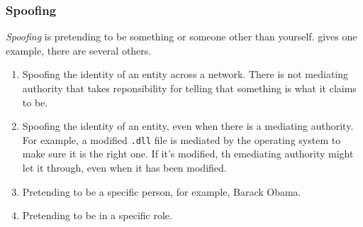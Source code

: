 \subsubsection{Spoofing}\label{subsubsec:Spoofing}
\begin{definition}[Spoofing]\label{def:Spoofing}
  \emph{Spoofing} is pretending to be something or someone other than yourself.
   gives one example, there are several others.

  \begin{enumerate}[noitemsep]
  \item Spoofing the identity of an entity across a network.
    There is not mediating authority that takes reponsibility for telling that something is what it claims to be.
  \item Spoofing the identity of an entity, even when there is a mediating authority.
    For example, a modified \texttt{.dll} file is mediated by the operating system to make sure it is the right one.
    If it's modified, th emediating authority might let it through, even when it has been modified.
  \item Pretending to be a specific person, for example, Barack Obama.
  \item Pretending to be in a specific role.
  \end{enumerate}
\end{definition}

